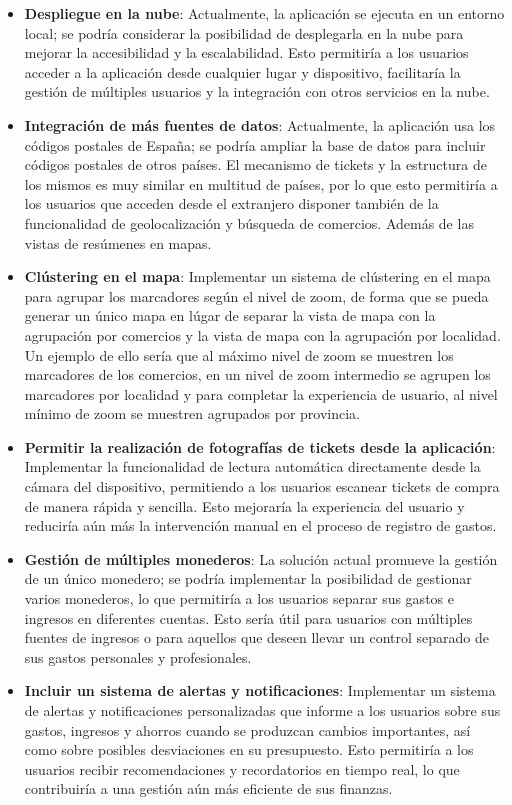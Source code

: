 \begin{itemize}
    \item \textbf{Despliegue en la nube}: Actualmente, la aplicación se ejecuta en un entorno local; se podría considerar la posibilidad de desplegarla en la nube para mejorar la accesibilidad y la escalabilidad. Esto permitiría a los usuarios acceder a la aplicación desde cualquier lugar y dispositivo, facilitaría la gestión de múltiples usuarios y la integración con otros servicios en la nube.
    \item \textbf{Integración de más fuentes de datos}: Actualmente, la aplicación usa los códigos postales de España; se podría ampliar la base de datos para incluir códigos postales de otros países. El mecanismo de tickets y la estructura de los mismos es muy similar en multitud de países, por lo que esto permitiría a los usuarios que acceden desde el extranjero disponer también de la funcionalidad de geolocalización y búsqueda de comercios. Además de las vistas de resúmenes en mapas.
    \item \textbf{Clústering en el mapa}: Implementar un sistema de clústering en el mapa para agrupar los marcadores según el nivel de zoom, de forma que se pueda generar un único mapa en lúgar de separar la vista de mapa con la agrupación por comercios y la vista de mapa con la agrupación por localidad. Un ejemplo de ello sería que al máximo nivel de zoom se muestren los marcadores de los comercios, en un nivel de zoom intermedio se agrupen los marcadores por localidad y para completar la experiencia de usuario, al nivel mínimo de zoom se muestren agrupados por provincia.
    \item \textbf{Permitir la realización de fotografías de tickets desde la aplicación}: Implementar la funcionalidad de lectura automática directamente desde la cámara del dispositivo, permitiendo a los usuarios escanear tickets de compra de manera rápida y sencilla. Esto mejoraría la experiencia del usuario y reduciría aún más la intervención manual en el proceso de registro de gastos.
    \item \textbf{Gestión de múltiples monederos}: La solución actual promueve la gestión de un único monedero; se podría implementar la posibilidad de gestionar varios monederos, lo que permitiría a los usuarios separar sus gastos e ingresos en diferentes cuentas. Esto sería útil para usuarios con múltiples fuentes de ingresos o para aquellos que deseen llevar un control separado de sus gastos personales y profesionales.
    \item \textbf{Incluir un sistema de alertas y notificaciones}: Implementar un sistema de alertas y notificaciones personalizadas que informe a los usuarios sobre sus gastos, ingresos y ahorros cuando se produzcan cambios importantes, así como sobre posibles desviaciones en su presupuesto. Esto permitiría a los usuarios recibir recomendaciones y recordatorios en tiempo real, lo que contribuiría a una gestión aún más eficiente de sus finanzas.

\end{itemize}
